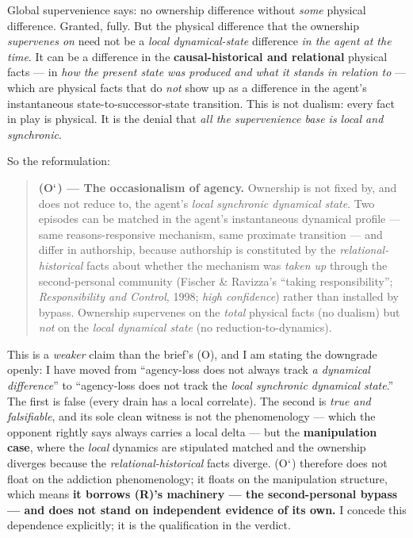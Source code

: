 \documentclass[11pt]{article}
\begin{document}
Global supervenience says: no ownership difference without \emph{some} physical difference. Granted, fully. But the physical difference that the ownership \emph{supervenes on} need not be a \emph{local dynamical-state} difference \emph{in the agent at the time}. It can be a difference in the \textbf{causal-historical and relational} physical facts — in \emph{how the present state was produced and what it stands in relation to} — which are physical facts that do \emph{not} show up as a difference in the agent's instantaneous state-to-successor-state transition. This is not dualism: every fact in play is physical. It is the denial that \emph{all the supervenience base is local and synchronic}.

So the reformulation:

\begin{quote}
\textbf{(O\ensuremath{`}) — The occasionalism of agency.} Ownership is not fixed by, and does not reduce to, the agent's \emph{local synchronic dynamical state}. Two episodes can be matched in the agent's instantaneous dynamical profile — same reasons-responsive mechanism, same proximate transition — and differ in authorship, because authorship is constituted by the \emph{relational-historical} facts about whether the mechanism was \emph{taken up} through the second-personal community (Fischer \& Ravizza's ``taking responsibility''; \emph{Responsibility and Control}, 1998; \emph{high confidence}) rather than installed by bypass. Ownership supervenes on the \emph{total} physical facts (no dualism) but \emph{not} on the \emph{local dynamical state} (no reduction-to-dynamics).
\end{quote}

This is a \emph{weaker} claim than the brief's (O), and I am stating the downgrade openly: I have moved from ``agency-loss does not always track \emph{a dynamical difference}'' to ``agency-loss does not track the \emph{local synchronic dynamical state}.'' The first is false (every drain has a local correlate). The second is \emph{true and falsifiable}, and its sole clean witness is not the phenomenology — which the opponent rightly says always carries a local delta — but the \textbf{manipulation case}, where the \emph{local} dynamics are stipulated matched and the ownership diverges because the \emph{relational-historical} facts diverge. (O\ensuremath{`}) therefore does not float on the addiction phenomenology; it floats on the manipulation structure, which means \textbf{it borrows (R)'s machinery — the second-personal bypass — and does not stand on independent evidence of its own.} I concede this dependence explicitly; it is the qualification in the verdict.
\end{document}
